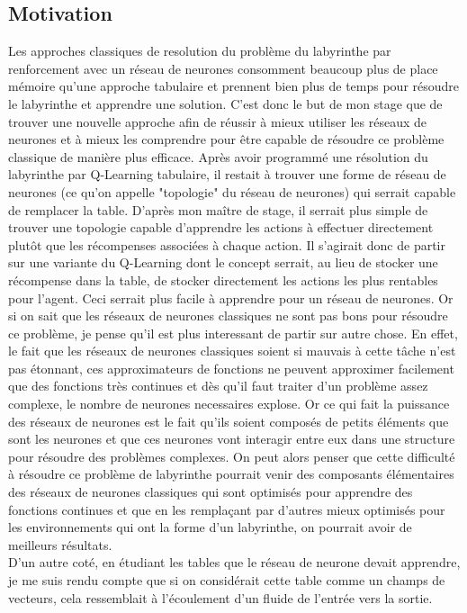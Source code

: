 \documentclass[12pt]{article}
\begin{document}
\subsection{Motivation}
Les approches classiques de resolution du problème du labyrinthe par renforcement avec un réseau de neurones consomment beaucoup plus de place mémoire qu'une approche tabulaire et prennent bien plus de temps pour résoudre le labyrinthe et apprendre une solution. C'est donc le but de mon stage que de trouver une nouvelle approche afin de réussir à mieux utiliser les réseaux de neurones et à mieux les comprendre pour être capable de résoudre ce problème classique de manière plus efficace. 
Après avoir programmé une résolution du labyrinthe par Q-Learning tabulaire, il restait à trouver une forme de réseau de neurones (ce qu'on appelle "topologie" du réseau de neurones) qui serrait capable de remplacer la table. D'après mon maître de stage, il serrait plus simple de trouver une topologie capable d'apprendre les actions à effectuer directement plutôt que les récompenses associées à chaque action. Il s'agirait donc de partir sur une variante du Q-Learning dont le concept serrait, au lieu de stocker une récompense dans la table, de stocker directement les actions les plus rentables pour l'agent. Ceci serrait plus facile à apprendre pour un réseau de neurones. Or si on sait que les réseaux de neurones classiques ne sont pas bons pour résoudre ce problème, je pense qu'il est plus interessant de partir sur autre chose. En effet, le fait que les réseaux de neurones classiques soient si mauvais à cette tâche n'est pas étonnant, ces approximateurs de fonctions ne peuvent approximer facilement que des fonctions très continues et dès qu'il faut traiter d'un problème assez complexe, le nombre de neurones necessaires explose. Or ce qui fait la puissance des réseaux de neurones est le fait qu'ils soient composés de petits éléments que sont les neurones et que ces neurones vont interagir entre eux dans une structure pour résoudre des problèmes complexes. On peut alors penser que cette difficulté à résoudre ce problème de labyrinthe pourrait venir des composants élémentaires des réseaux de neurones classiques qui sont optimisés pour apprendre des fonctions continues et que en les remplaçant par d'autres mieux optimisés pour les environnements qui ont la forme d'un labyrinthe, on pourrait avoir de meilleurs résultats.\\
 D'un autre coté, en étudiant les tables que le réseau de neurone devait apprendre, je me suis rendu compte que si on considérait cette table comme un champs de vecteurs, cela ressemblait à l'écoulement d'un fluide de l'entrée vers la sortie.
\end{document}

